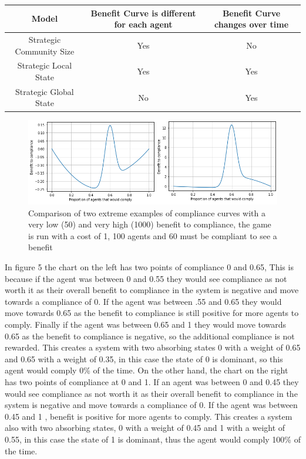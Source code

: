 \documentclass{article}
\begin{document}
\begin{tabular}{|c|c|c|}
\hline
Model & Benefit Curve is different for each agent & Benefit Curve changes over time\\ \hline
Strategic Community Size & Yes & No \\ \hline
Strategic Local State & Yes &Yes\\ \hline
Strategic Global State & No &Yes\\ \hline
\end{tabular}
\newline


\begin{figure}[h!]
\centering
\includegraphics[width=12cm]{strat}
\caption{Comparison of two extreme examples of compliance curves with a very low (50) and very high (1000) benefit to compliance, the game is run with a cost of 1, 100 agents and 60 must be compliant to see a benefit}
\end{figure}

In figure 5 the chart on the left has two points of compliance 0 and 0.65, This is because if the agent was between 0 and 0.55 they would see compliance as not worth it as their overall benefit to compliance in the system is negative and move towards a compliance of 0. If the agent was between .55 and 0.65 they would move towards 0.65 as the benefit to compliance is still positive for more agents to comply. Finally if the agent was between 0.65 and 1 they would move towards 0.65 as the benefit to compliance is negative, so the additional compliance is not rewarded. This creates a system with two absorbing states 0 with a weight of 0.65 and 0.65 with a weight of 0.35, in this case the state of 0 is dominant, so this agent would comply 0\% of the time. \newline\newline
On the other hand, the chart on the right has two points of compliance at 0 and 1. If an agent was between 0 and 0.45 they would see compliance as not worth it as their overall benefit to compliance in the system is negative and move towards a compliance of 0. If the agent was between 0.45 and 1 , benefit is positive for more agents to comply. This creates a system also with two absorbing states, 0 with a weight of 0.45 and 1 with a weight of 0.55, in this case the state of 1 is dominant, thus the agent would comply 100\% of the time.
\newpage
\end{document}
